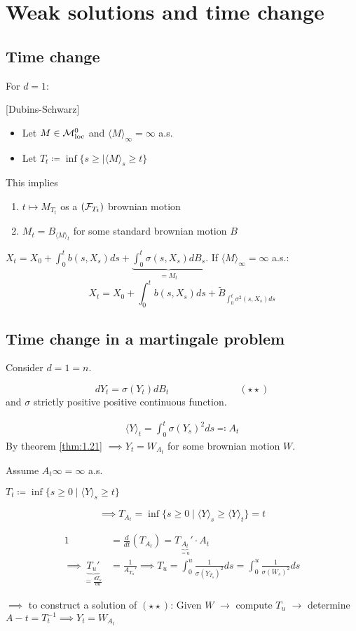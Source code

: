 \section{Weak solutions and time change}

\subsection{Time change}

For $d=1$:

\begin{theorem}\label{thm:1.21}[Dubins-Schwarz]
    \begin{itemize}
        \item Let $M\in\mathcal{M}_{\text{loc}}^0$ and $\langle M\rangle_\infty=\infty$ a.s. 
        \item Let $T_t\coloneqq \inf\{s\geq |\langle M\rangle_s \geq t\}$
    \end{itemize}
    This implies    
    \begin{enumerate}
        \item $t\mapsto M_{T_t}$ os a $(\mathcal{F}_{T_t})$ brownian motion
        \item $M_t=B_{\langle M\rangle_t}$ for some standard brownian motion $B$
    \end{enumerate}
\end{theorem}

$X_t=X_0+\int_0^t b(s,X_s)ds+\underbrace{\int_0^t \sigma(s,X_s)dB_s}_{=M_t}$.
If $\langle M\rangle_\infty=\infty$ a.s.:
\[X_t=X_0+\int_0^tb(s,X_s)ds+\tilde{B}_{\int_0^t \sigma^2(s,X_s)ds}\]

\subsection{Time change in a martingale problem}

Consider $d=1=n$.

\[dY_t=\sigma(Y_t)dB_t \hspace{3cm}(\star\star)\]
and $\sigma$ strictly positive positive continuous function.

\begin{align*}
    \langle Y\rangle_t=\int_0^t\sigma(Y_s)^2 ds\eqqcolon A_t
\end{align*}
By theorem \ref{thm:1.21} $\implies Y_t=W_{A_t}$ for some brownian motion $W$.

Assume $A_t\infty=\infty$ a.s.

$T_t\coloneqq \inf\{s\geq 0\mid \langle Y\rangle_s \geq t\}$

\[\implies T_{A_t}=\inf\{s\geq 0\mid \langle Y\rangle_s\geq \langle Y\rangle_t\}=t\]

\begin{align*}
    1&=\frac{d}{dt}\left(T_{A_t}\right)=T_{\underbrace{A_t}_{=u}}'\cdot A_t\\
    \implies \underbrace{T_u'}_{=\frac{dT_u}{du}}&=\frac{1}{A_{T_u}'} \implies T_u = \int_0^u \frac{1}{\sigma(Y_{T_s})^2}ds=\int_0^u \frac{1}{\sigma(W_s)^2}ds
\end{align*}

$\implies$ to construct a solution of $(\star\star)$: Given $W$ $\longrightarrow$ compute $T_u$ $\longrightarrow$ determine $A-t=T_t^{-1}\implies Y_t=W_{A_t}$